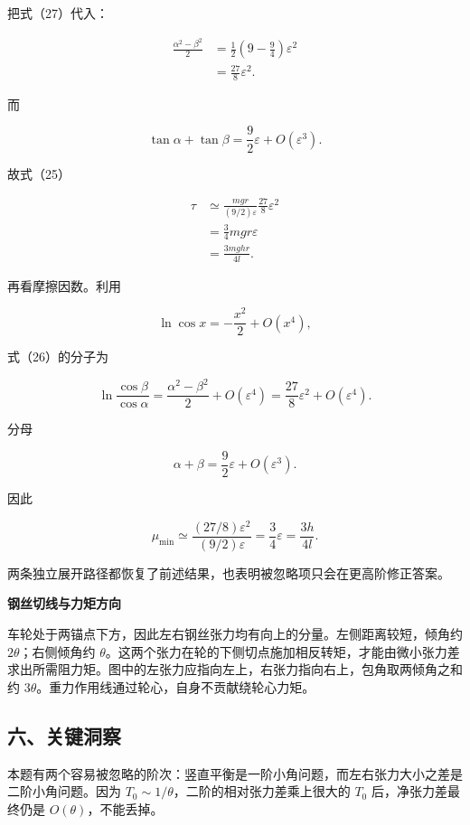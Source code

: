 \documentclass[12pt,a4paper,UTF8]{ctexart}
\begin{document}
把式（27）代入：

\[
\begin{aligned}
\frac{\alpha^2-\beta^2}{2}
&=\frac12
\left(9-\frac94\right)\varepsilon^2\\
&=\frac{27}{8}\varepsilon^2.
\end{aligned}
\]

而

\[
\tan\alpha+\tan\beta
=\frac92\varepsilon+O(\varepsilon^3).
\]

故式（25）

\[
\begin{aligned}
\tau
&\simeq
\frac{mgr}{(9/2)\varepsilon}
\frac{27}{8}\varepsilon^2\\
&=\frac34mgr\varepsilon\\
&=\frac{3mghr}{4l}.
\end{aligned}
\]

再看摩擦因数。利用

\[
\ln\cos x=-\frac{x^2}{2}+O(x^4),
\]

式（26）的分子为

\[
\ln\frac{\cos\beta}{\cos\alpha}
=\frac{\alpha^2-\beta^2}{2}
+O(\varepsilon^4)
=\frac{27}{8}\varepsilon^2+O(\varepsilon^4).
\]

分母

\[
\alpha+\beta=\frac92\varepsilon+O(\varepsilon^3).
\]

因此

\[
\mu_{\min}
\simeq
\frac{(27/8)\varepsilon^2}{(9/2)\varepsilon}
=\frac34\varepsilon
=\frac{3h}{4l}.
\]

两条独立展开路径都恢复了前述结果，也表明被忽略项只会在更高阶修正答案。

\textbf{钢丝切线与力矩方向}

车轮处于两锚点下方，因此左右钢丝张力均有向上的分量。左侧距离较短，倾角约
\(2\theta\)；右侧倾角约
\(\theta\)。这两个张力在轮的下侧切点施加相反转矩，才能由微小张力差求出所需阻力矩。图中的左张力应指向左上，右张力指向右上，包角取两倾角之和约
\(3\theta\)。重力作用线通过轮心，自身不贡献绕轮心力矩。

\subsection{六、关键洞察}\label{ux516dux5173ux952eux6d1eux5bdf-4}

本题有两个容易被忽略的阶次：竖直平衡是一阶小角问题，而左右张力大小之差是二阶小角问题。因为
\(T_0\sim1/\theta\)，二阶的相对张力差乘上很大的 \(T_0\)
后，净张力差最终仍是 \(O(\theta)\)，不能丢掉。
\end{document}
